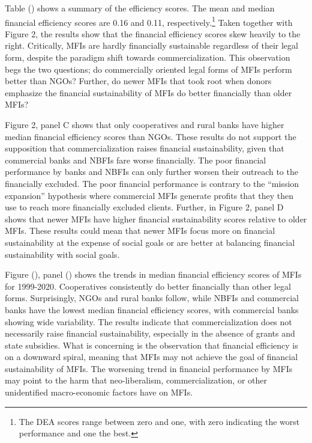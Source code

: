 \documentclass[
]{article}
\begin{document}
Table () shows a summary of the efficiency scores. The mean and median
financial efficiency scores are 0.16 and 0.11, respectively.\footnote{The
  DEA scores range between zero and one, with zero indicating the worst
  performance and one the best.} Taken together with Figure 2, the
results show that the financial efficiency scores skew heavily to the
right. Critically, MFIs are hardly financially sustainable regardless of
their legal form, despite the paradigm shift towards commercialization.
This observation begs the two questions; do commercially oriented legal
forms of MFIs perform better than NGOs? Further, do newer MFIs that took
root when donors emphasize the financial sustainability of MFIs do
better financially than older MFIs?

Figure 2, panel C shows that only cooperatives and rural banks have
higher median financial efficiency scores than NGOs. These results do
not support the supposition that commercialization raises financial
sustainability, given that commercial banks and NBFIs fare worse
financially. The poor financial performance by banks and NBFIs can only
further worsen their outreach to the financially excluded. The poor
financial performance is contrary to the ``mission expansion''
hypothesis where commercial MFIs generate profits that they then use to
reach more financially excluded clients. Further, in Figure 2, panel D
shows that newer MFIs have higher financial sustainability scores
relative to older MFIs. These results could mean that newer MFIs focus
more on financial sustainability at the expense of social goals or are
better at balancing financial sustainability with social goals.

Figure (), panel () shows the trends in median financial efficiency
scores of MFIs for 1999-2020. Cooperatives consistently do better
financially than other legal forms. Surprisingly, NGOs and rural banks
follow, while NBFIs and commercial banks have the lowest median
financial efficiency scores, with commercial banks showing wide
variability. The results indicate that commercialization does not
necessarily raise financial sustainability, especially in the absence of
grants and state subsidies. What is concerning is the observation that
financial efficiency is on a downward spiral, meaning that MFIs may not
achieve the goal of financial sustainability of MFIs. The worsening
trend in financial performance by MFIs may point to the harm that
neo-liberalism, commercialization, or other unidentified macro-economic
factors have on MFIs.
\end{document}

